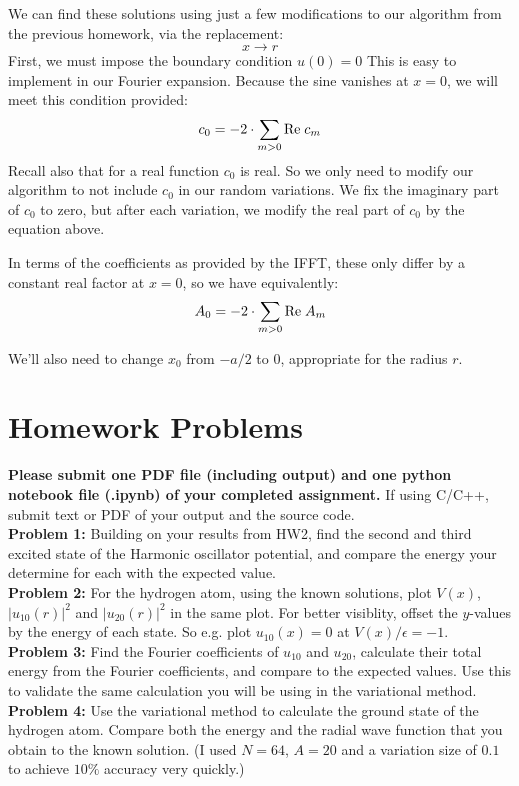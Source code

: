 \documentclass[12pt]{article}
\begin{document}
We can find these solutions using just a few modifications to our algorithm from the previous homework, via the replacement:
$$x \longrightarrow r$$
First, we must impose the boundary condition
$u(0)=0$
This is easy to implement in our Fourier expansion.  Because the sine vanishes at $x=0$, we will meet this condition provided:
$$c_0 = - 2 \cdot \sum_{m>0} {{\rm Re}\;{c_m}}$$
Recall also that for a real function $c_0$ is real.  So we only need to
modify our algorithm to not include $c_0$ in our random variations.
We fix the imaginary part of $c_0$ to zero, but after each variation,
we modify the real part of $c_0$ by the equation above.

In terms of the coefficients as provided by the IFFT, these only
differ by a constant real factor at $x=0$, so we have equivalently:
$$A_0 = - 2 \cdot \sum_{m>0} {{\rm Re}\;{A_m}}$$

We'll also need to change $x_0$ from $-a/2$ to $0$, appropriate for the radius $r$.


\section{Homework Problems}

\noindent
{\bf Please submit one PDF file (including output) and one python
  notebook file (.ipynb) of your completed assignment.}  If using
C/C++, submit text or PDF of your output and the source code.\\[3pt]


\noindent
{\bf Problem 1:} Building on your results from HW2, find the second
and third excited state of the Harmonic oscillator potential, and compare
the energy your determine for each with the expected value.\\[5pt]

\noindent
{\bf Problem 2:} For the hydrogen atom, using the known solutions,
plot $V(x)$, $|u_{10}(r)|^2$ and $|u_{20}(r)|^2$ in the same plot.
For better visiblity, offset the $y$-values by the energy of each
state.  So e.g. plot $u_{10}(x)=0$ at $V(x)/\epsilon=-1$.\\[5pt]

\noindent
{\bf Problem 3:} Find the Fourier coefficients of $u_{10}$ and
$u_{20}$, calculate their total energy from the Fourier coefficients,
and compare to the expected values.  Use this to validate the same
calculation you will be using in the variational method.\\[5pt]

\noindent
{\bf Problem 4:} Use the variational method to calculate the ground
state of the hydrogen atom.  Compare both the energy and the radial
wave function that you obtain to the known solution.  (I used $N=64$,
$A=20$ and a variation size of $0.1$ to achieve $10\%$ accuracy very
quickly.)\\[5pt]
\end{document}
